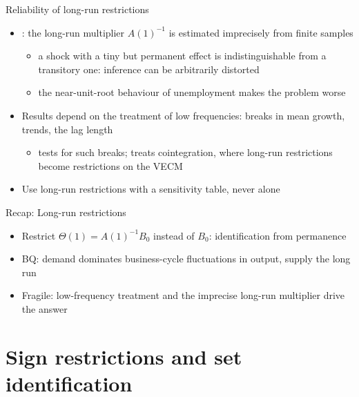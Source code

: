 \begin{frame}{Reliability of long-run restrictions}
\itemsize{\small}
\begin{itemize}
    \item {}: the long-run multiplier $A(1)^{-1}$ is estimated imprecisely from finite samples
    \begin{itemize}
        \item a shock with a tiny but permanent effect is indistinguishable from a transitory one: inference can be arbitrarily distorted
        \item the near-unit-root behaviour of unemployment makes the problem worse
    \end{itemize}
    \item Results depend on the treatment of low frequencies: breaks in mean growth, trends, the lag length
    \begin{itemize}
        \item {} tests for such breaks;  treats cointegration, where long-run restrictions become restrictions on the VECM
    \end{itemize}
    \item Use long-run restrictions with a sensitivity table, never alone
\end{itemize}
\end{frame}

\begin{frame}{Recap: Long-run restrictions}
\itemsize{\small}
\begin{itemize}
    \item Restrict $\Theta(1) = A(1)^{-1}B_0$ instead of $B_0$: identification from permanence
    \item BQ: demand dominates business-cycle fluctuations in output, supply the long run
    \item Fragile: low-frequency treatment and the imprecise long-run multiplier drive the answer
\end{itemize}
\end{frame}


\section{Sign restrictions and set identification}

